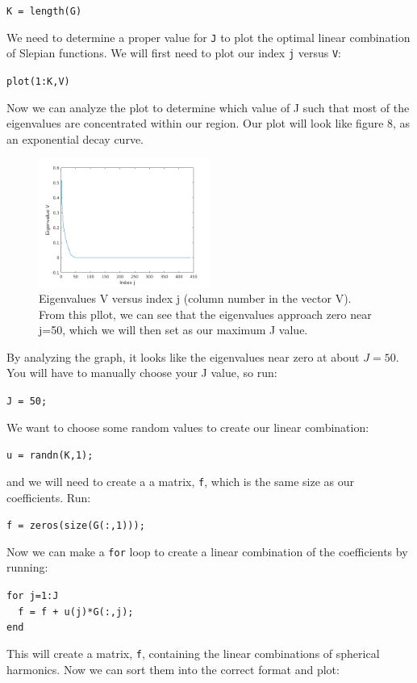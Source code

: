 \documentclass[11pt]{article}
\begin{document}
\verb|K = length(G)|

We need to determine a proper value for \verb+J+ to plot the optimal linear combination of Slepian functions.  We will first need to plot our index \verb+j+ versus \verb+V+:

\verb|plot(1:K,V)|

Now we can analyze the plot to determine which value of J such that most of the eigenvalues are concentrated within our region.  Our plot will look like figure 8, as an exponential decay curve.  

\begin{figure}[H]
  \centering
  \includegraphics[width=0.5\textwidth]{figures/Vvsj_ml.png}
  \caption{Eigenvalues V versus index j (column number in the vector V).  From this pllot, we can see that the eigenvalues approach zero near j=50, which we will then set as our maximum J value.}
\label{eigenvalue}
\end{figure}

By analyzing the graph, it looks like the eigenvalues near zero at about $J=50$.  You will have to manually choose your J value, so run:

\verb+J = 50;+

We want to choose some random values to create our linear combination:

\verb|u = randn(K,1);|

and we will need to create a a matrix, \verb+f+, which is the same size as our coefficients. Run:

\verb|f = zeros(size(G(:,1)));|

Now we can make a \verb|for| loop to create a linear combination of the coefficients by running:

\verb|for j=1:J|\\
\verb|	f = f + u(j)*G(:,j);|\\
\verb|end|

This will create a matrix, \verb|f|, containing the linear combinations of spherical harmonics.  Now we can sort them into the correct format and plot:
\end{document}

